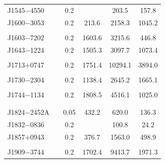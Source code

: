 \documentclass[useAMS,usenatbib]{mn2e}
\begin{document}
\begin{appendix}
\begin{table}
\begin{tabular}{lccccc}
J1545$-$4550 & \citet{Burgay13}                    & 0.2   &             	 &     203.5  	&      157.8    \\
J1600$-$3053 & \citet{Ord04,Yan11}                 & 0.2   &      213.6 	 &    2158.3  	&     1045.2    \\  
             &                                     &       &               &              &               \\
J1603$-$7202 & \citet{Manchester04,Ord04,Yan11}    & 0.2   &     1603.6 	 &    3215.6  	&      446.8    \\  
J1643$-$1224 & \citet{Xilouris98,Stairs99}         & 0.2   &     1505.3 	 &    3097.7  	&     1073.4    \\   
             & \citet{Ord04,Yan11}                 &       &               &              &               \\  
J1713$+$0747 & \citet{Xilouris98,Stairs99}         & 0.2   &     1751.4 	 &   10294.1  	&     3894.0    \\  
             & \citet{Ord04,Yan11}                 &       &               &              &               \\  
J1730$-$2304 & \citet{Xilouris98,Kramer98}         & 0.2   &     1138.4 	 &    2645.2  	&     1665.1    \\  
             & \citet{Stairs99,Ord04,Yan11}        &       &               &              &               \\  
J1744$-$1134 & \citet{Xilouris98,Kramer98}         & 0.2   &     1808.5 	 &    4516.1  	&     1025.0    \\  
             & \citet{Stairs99,Ord04,Yan11}        &       &               &              &               \\  
             &                                     &       &               &              &               \\
J1824$-$2452A& \citet{Ord04,Yan11,Stairs99}        & 0.05  &      432.2 	 &     620.0  	&      136.3    \\  
J1832$-$0836 & \citet{Burgay13}                    & 0.2   &            	 &     100.8  	&       24.2    \\  
J1857$+$0943 & \citet{Thorsett90,Xilouris98}       & 0.2   &      376.7 	 &    1563.0  	&      498.9    \\  
             & \citet{Ord04,Yan11}                 &       &               &              &               \\  
J1909$-$3744 & \citet{Ord04,Yan11}                 & 0.2   &     1702.4 	 &    9413.7  	&     1971.3    \\  

\end{tabular}
\end{table}
\end{appendix}
\end{document}
